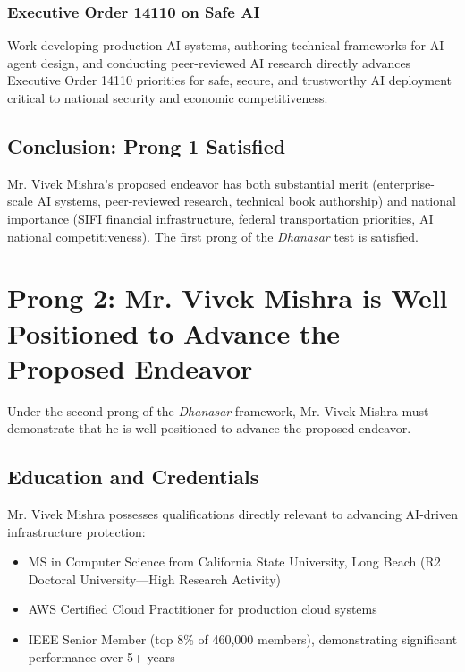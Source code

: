 \documentclass[11pt]{article}
\newcommand{\dr}{Mr. Vivek Mishra }
\newcommand{\drs}{Mr. Vivek Mishra's }
\begin{document}
\subsubsection{Executive Order 14110 on Safe AI}

Work developing production AI systems, authoring technical frameworks for AI agent design, and conducting peer-reviewed AI research directly advances Executive Order 14110 priorities for safe, secure, and trustworthy AI deployment critical to national security and economic competitiveness.

\subsection{Conclusion: Prong 1 Satisfied}

\drs proposed endeavor has both substantial merit (enterprise-scale AI systems, peer-reviewed research, technical book authorship) and national importance (SIFI financial infrastructure, federal transportation priorities, AI national competitiveness). The first prong of the \textit{Dhanasar} test is satisfied.

\pagebreak


\section{Prong 2: \dr is Well Positioned to Advance the Proposed Endeavor}
\label{sec:prong2}

Under the second prong of the \textit{Dhanasar} framework, \dr must demonstrate that he is well positioned to advance the proposed endeavor.

\subsection{Education and Credentials}

\dr possesses qualifications directly relevant to advancing AI-driven infrastructure protection:

\begin{itemize}
    \item MS in Computer Science from California State University, Long Beach (R2 Doctoral University—High Research Activity)
    \item AWS Certified Cloud Practitioner for production cloud systems
    \item IEEE Senior Member (top 8\% of 460,000 members), demonstrating significant performance over 5+ years
\end{itemize}
\end{document}

